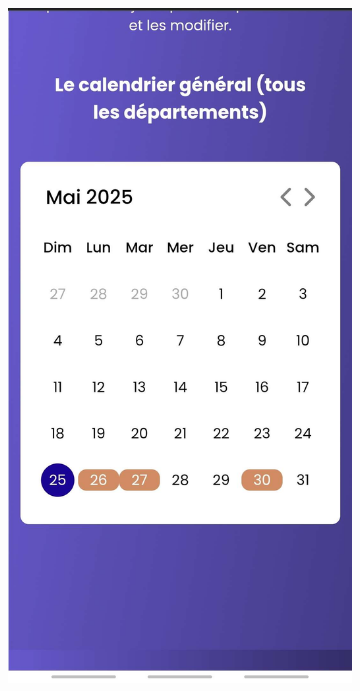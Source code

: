 \documentclass{article}
\begin{document}
\begin{figure}[H]
  \centering
  \begin{subfigure}[t]{0.3\textwidth}
    \centering
    \includegraphics[width=\textwidth]{picres2.jpg}
    \label{fig:for}
  \end{subfigure}
  \hspace{1cm}

\end{figure}
\end{document}
